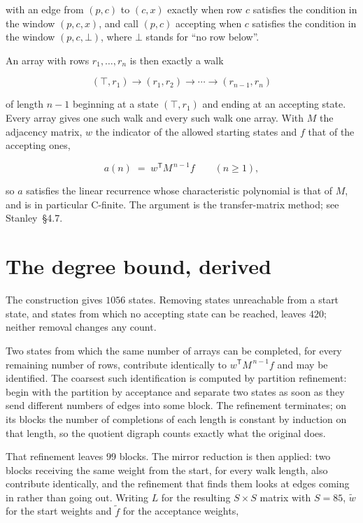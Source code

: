 \documentclass[11pt]{article}
\theoremstyle{definition}
\begin{document}
with an edge from $(p,c)$ to $(c,x)$ exactly when row $c$ satisfies the condition in the window $(p,c,x)$, and call $(p,c)$ accepting when $c$ satisfies the condition in the window $(p,c,\bot)$, where $\bot$ stands for ``no row below''.

An array with rows $r_1,\dots,r_n$ is then exactly a walk

\[(\top,r_1) \to (r_1,r_2) \to \cdots \to (r_{n-1},r_n)\]

of length $n-1$ beginning at a state $(\top,r_1)$ and ending at an accepting state. Every array gives one such walk and every such walk one array. With $M$ the adjacency matrix, $w$ the indicator of the allowed starting states and $f$ that of the accepting ones,

\[a(n) \;=\; w^{\mathsf T} M^{\,n-1} f \qquad (n \ge 1),\]

so $a$ satisfies the linear recurrence whose characteristic polynomial is that of $M$, and is in particular C-finite. The argument is the transfer-matrix method; see Stanley~\S4.7.

\section{The degree bound, derived}

The construction gives $1056$ states. Removing states unreachable from a start state, and states from which no accepting state can be reached, leaves $420$; neither removal changes any count.

Two states from which the same number of arrays can be completed, for every remaining number of rows, contribute identically to $w^{\mathsf T}M^{\,n-1}f$ and may be identified. The coarsest such identification is computed by partition refinement: begin with the partition by acceptance and separate two states as soon as they send different numbers of edges into some block. The refinement terminates; on its blocks the number of completions of each length is constant by induction on that length, so the quotient digraph counts exactly what the original does.

That refinement leaves $99$ blocks. The mirror reduction is then applied: two blocks receiving the same weight from the start, for every walk length, also contribute identically, and the refinement that finds them looks at edges coming in rather than going out. Writing $L$ for the resulting $S \times S$ matrix with $S = 85$, $\tilde w$ for the start weights and $\tilde f$ for the acceptance weights,
\end{document}

